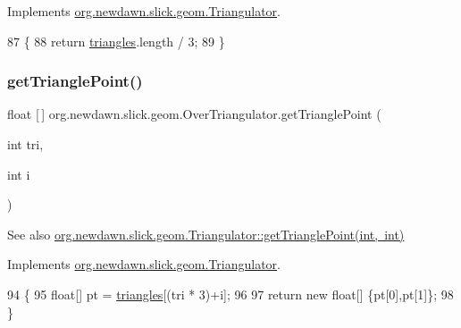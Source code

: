 Implements \mbox{\hyperlink{interfaceorg_1_1newdawn_1_1slick_1_1geom_1_1_triangulator_a7a5d68a694f2b80878c48563b5ea6f1f}{org.\+newdawn.\+slick.\+geom.\+Triangulator}}.


\begin{DoxyCode}
87                                   \{
88         \textcolor{keywordflow}{return} \mbox{\hyperlink{classorg_1_1newdawn_1_1slick_1_1geom_1_1_over_triangulator_a81f4d764fe0327ce4cd6692e777cc5f6}{triangles}}.length / 3;
89     \}
\end{DoxyCode}
\mbox{\label{classorg_1_1newdawn_1_1slick_1_1geom_1_1_over_triangulator_ab101143b175d129d50115b7135e2cdf4}} 
\subsubsection{\texorpdfstring{get\+Triangle\+Point()}{getTrianglePoint()}}
{\footnotesize\ttfamily float \mbox{[}$\,$\mbox{]} org.\+newdawn.\+slick.\+geom.\+Over\+Triangulator.\+get\+Triangle\+Point (\begin{DoxyParamCaption}\item[{int}]{tri,  }\item[{int}]{i }\end{DoxyParamCaption})\hspace{0.3cm}{\ttfamily [inline]}}

\begin{DoxySeeAlso}{See also}
\mbox{\hyperlink{interfaceorg_1_1newdawn_1_1slick_1_1geom_1_1_triangulator_a0142ec1a5f11292813f0f4e9a1407efb}{org.\+newdawn.\+slick.\+geom.\+Triangulator\+::get\+Triangle\+Point(int, int)}} 
\end{DoxySeeAlso}


Implements \mbox{\hyperlink{interfaceorg_1_1newdawn_1_1slick_1_1geom_1_1_triangulator_a0142ec1a5f11292813f0f4e9a1407efb}{org.\+newdawn.\+slick.\+geom.\+Triangulator}}.


\begin{DoxyCode}
94                                                     \{
95         \textcolor{keywordtype}{float}[] pt = \mbox{\hyperlink{classorg_1_1newdawn_1_1slick_1_1geom_1_1_over_triangulator_a81f4d764fe0327ce4cd6692e777cc5f6}{triangles}}[(tri * 3)+i];
96     
97         \textcolor{keywordflow}{return} \textcolor{keyword}{new} \textcolor{keywordtype}{float}[] \{pt[0],pt[1]\};
98     \}
\end{DoxyCode}
\mbox{\label{classorg_1_1newdawn_1_1slick_1_1geom_1_1_over_triangulator_afc94b0bfad20289f2d9988621b602aca}} 
